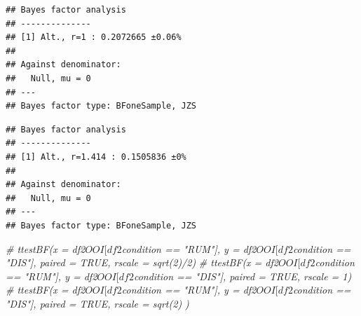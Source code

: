 \documentclass[
  english,
  man,floatsintext]{apa6}
\newenvironment{Shaded}{\begin{snugshade}}{\end{snugshade}}
\newcommand{\CommentTok}[1]{\textcolor[rgb]{0.56,0.35,0.01}{\textit{#1}}}
\newcommand{\DataTypeTok}[1]{\textcolor[rgb]{0.13,0.29,0.53}{#1}}
\newcommand{\KeywordTok}[1]{\textcolor[rgb]{0.13,0.29,0.53}{\textbf{#1}}}
\newcommand{\NormalTok}[1]{#1}
\newcommand{\OperatorTok}[1]{\textcolor[rgb]{0.81,0.36,0.00}{\textbf{#1}}}
\newcommand{\OtherTok}[1]{\textcolor[rgb]{0.56,0.35,0.01}{#1}}
\newcommand{\StringTok}[1]{\textcolor[rgb]{0.31,0.60,0.02}{#1}}
\begin{document}
\begin{Shaded}
\end{Shaded}

\begin{verbatim}
## Bayes factor analysis
## --------------
## [1] Alt., r=1 : 0.2072665 ±0.06%
## 
## Against denominator:
##   Null, mu = 0 
## ---
## Bayes factor type: BFoneSample, JZS
\end{verbatim}

\begin{Shaded}
\end{Shaded}

\begin{verbatim}
## Bayes factor analysis
## --------------
## [1] Alt., r=1.414 : 0.1505836 ±0%
## 
## Against denominator:
##   Null, mu = 0 
## ---
## Bayes factor type: BFoneSample, JZS
\end{verbatim}

\begin{Shaded}
\begin{Highlighting}[]
\CommentTok{\# ttestBF(x = df2$OOI[df2$condition == "RUM"], y = df2$OOI[df2$condition == "DIS"], paired = TRUE, rscale = sqrt(2)/2)}
\CommentTok{\# ttestBF(x = df2$OOI[df2$condition == "RUM"], y = df2$OOI[df2$condition == "DIS"], paired = TRUE, rscale = 1)}
\CommentTok{\# ttestBF(x = df2$OOI[df2$condition == "RUM"], y = df2$OOI[df2$condition == "DIS"], paired = TRUE, rscale = sqrt(2) )}
\end{Highlighting}
\end{Shaded}
\end{document}
